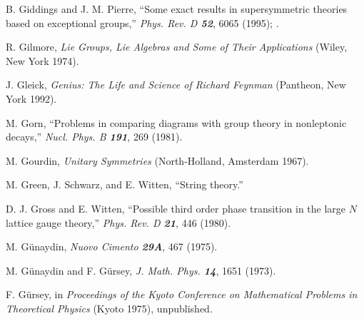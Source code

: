  B. Giddings and J. M. Pierre,
    ``Some exact results in supersymmetric theories
      based on exceptional groups,''
{\em Phys.  Rev.   D \bf 52}, 6065 (1995);
.

 R. Gilmore,
    {\em Lie Groups, Lie Algebras and Some of Their Applications}
    (Wiley, New York 1974).

 J. Gleick,
    {\em Genius: The Life and Science of Richard Feynman}
    (Pantheon, New York 1992).


 M. Gorn,
``Problems in comparing diagrams with group theory in nonleptonic decays,''
{\em Nucl.  Phys.  B  \bf 191}, 269 (1981).

 M. Gourdin,
{\em Unitary Symmetries}
(North-Holland, Amsterdam 1967).

M. Green, J. Schwarz, and E. Witten,
    ``String theory.''

 D. J. Gross and E. Witten,
    ``Possible third order phase transition in
      the large $N$ lattice gauge theory,''
    {\em Phys.  Rev.    D \bf 21}, 446 (1980).

 M. G{\"u}naydin,
{\em Nuovo Cimento  \bf 29A}, 467 (1975).

M. G{\"u}naydin and F. G{\"u}rsey,
{\em J. Math. Phys.  \bf 14}, 1651 (1973).

F. G{\"u}rsey,
in {\em Proceedings of the Kyoto Conference on Mathematical Problems in Theoretical
Physics} (Kyoto 1975), unpublished.


